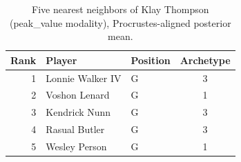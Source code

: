 \begin{table}[htbp]
  \centering\small
  \begin{tabular}{rllc}
    \toprule
    Rank & Player & Position & Archetype \\
    \midrule
    1 & Lonnie Walker IV & G & 3 \\
    2 & Voshon Lenard & G & 1 \\
    3 & Kendrick Nunn & G & 3 \\
    4 & Rasual Butler & G & 3 \\
    5 & Wesley Person & G & 1 \\
    \bottomrule
  \end{tabular}
  \caption{Five nearest neighbors of Klay Thompson (peak_value modality), Procrustes-aligned posterior mean.}
  \label{tab:Klay_Thompson_neighbors_peak_value}
\end{table}

